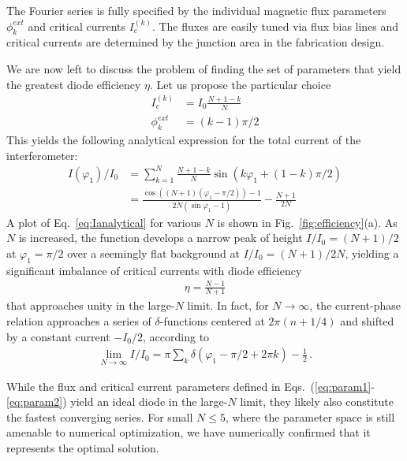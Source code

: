 \documentclass[aps,rsi,reprint,amsmath,amssymb,floatfix,longbibliography,superscriptaddress]{revtex4-1}
\begin{document}
The Fourier series
is fully specified by the
individual magnetic flux parameters
$\phi^{ext}_{k}$ and critical currents $I_c^{(k)}$. 
The fluxes are easily tuned via flux bias lines
and critical currents are determined by the junction area in the fabrication design.

We are now left to discuss the problem of finding the set of
parameters that yield the greatest diode efficiency $\eta$. Let us propose the particular choice
\begin{align}
	\label{eq:param1}
	I_{c}^{(k)} &= I_0 \frac{N+1-k}{N} \\
	\phi_{k}^{ext} &= (k-1) \pi/2
	\label{eq:param2}
\end{align}
%
This yields the following analytical expression for the total current of the
interferometer:
\begin{align}
	I(\varphi_1)/I_0
	&=
	\sum_{k=1}^{N} \frac{N+1-k}{N}\sin \left( k
		\varphi_1 +
		(1-k) \pi/2
	\right)
	\nonumber
	\\
	&=
	\frac{\cos \left((N+1)(\varphi_1-\pi/2) \right)-1}{2N \left(\sin \varphi_1 -1 \right)}
	-\frac{N+1}{2N}
	\label{eq:Ianalytical}
\end{align}
%
A plot of Eq.~\eqref{eq:Ianalytical} for various $N$ is shown in
Fig.~\ref{fig:efficiency}(a). As $N$ is increased, the function develops a
narrow peak of height $I/I_0=(N+1)/2$ at $\varphi_1 = \pi/2$ over a seemingly flat background
at $I/I_0=(N+1)/2N$, yielding a significant imbalance of critical currents
with diode efficiency
\begin{align}
    \eta = \frac{N-1}{N+1}
\end{align}
that approaches unity in the large-$N$ limit.
In fact, for $N\rightarrow \infty$, the current-phase relation approaches a
series of $\delta$-functions centered at $2\pi (n + 1/4)$ and shifted by a constant current $-I_0/2$, according to
\begin{align}
	\lim_{N\rightarrow \infty}I/I_0 = \pi\sum_k \delta(\varphi_1-\pi/2 + 2\pi k) -
	\frac{1}{2} \,.
\end{align}

While the flux and critical current parameters defined in
Eqs.~(\ref{eq:param1}-\ref{eq:param2}) yield an ideal
diode in the large-$N$ limit, they likely also constitute the fastest converging
series. For small $N\le 5$, where the parameter space is still amenable to numerical optimization, we have numerically confirmed that it represents the optimal solution.
\end{document}
